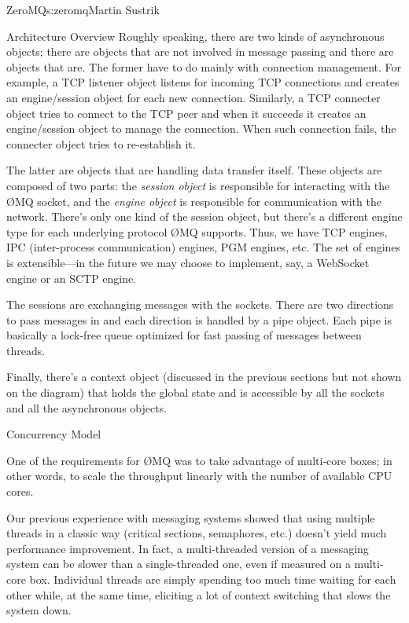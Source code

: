\begin{aosachapter}{ZeroMQ}{s:zeromq}{Martin Sustrik}
\begin{aosasect1}{Architecture Overview}
Roughly speaking, there are two kinds of asynchronous objects; there
are objects that are not involved in message passing and there are
objects that are.  
The former have to do mainly with connection management. For example,
a TCP listener object listens for incoming TCP connections and creates
an engine/session object for each new connection. Similarly, a TCP
connecter object tries to connect to the TCP peer and when it succeeds
it creates an engine/session object to manage the connection. When
such connection fails, the connecter object tries to re-establish it.

The latter are objects that are handling data transfer itself. These
objects are composed of two parts: the \emph{session object} is responsible for
interacting with the {\O}MQ socket, and the \emph{engine object} is responsible for
communication with the network. There's only one kind of the session
object, but there's a different engine type for each underlying
protocol {\O}MQ supports. Thus, we have TCP engines, IPC (inter-process
communication) engines, PGM
engines, etc. The set of engines is extensible---in the future we may
choose to implement, say, a WebSocket engine or an SCTP engine.

The sessions are exchanging messages with the sockets. There are two
directions to pass messages in and each direction is handled by a pipe
object. Each pipe is basically a lock-free queue optimized for fast passing
of messages between threads.

Finally, there's a context object (discussed in the previous sections but
not shown on the diagram) that holds the global state and is
accessible by all the sockets and all the asynchronous objects.

\end{aosasect1}

\begin{aosasect1}{Concurrency Model}

One of the requirements for {\O}MQ was to take advantage of multi-core
boxes; in other words, to scale the throughput linearly with the number of
available CPU cores.

Our previous experience with messaging systems showed that using
multiple threads in a classic way (critical sections, semaphores, etc.)
doesn't yield much performance improvement. In fact, a multi-threaded
version of a messaging system can be slower than a single-threaded
one, even if measured on a multi-core box. Individual threads are
simply spending too much time waiting for each other while, at the
same time, eliciting a lot of context switching that slows the system
down.


\end{aosasect1}
\end{aosachapter}
